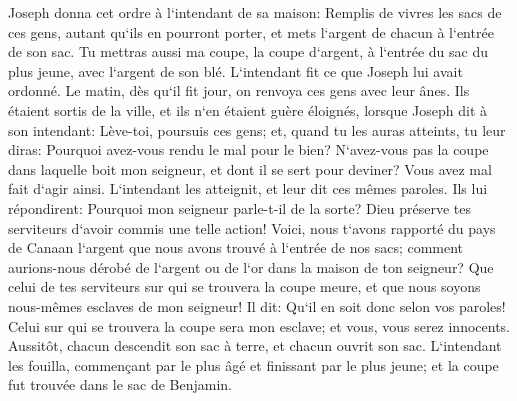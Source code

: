\verse Joseph donna cet ordre à l`intendant de sa maison: Remplis de vivres les sacs de ces gens, autant qu`ils en pourront porter, et mets l`argent de chacun à l`entrée de son sac. 
\verse Tu mettras aussi ma coupe, la coupe d`argent, à l`entrée du sac du plus jeune, avec l`argent de son blé. L`intendant fit ce que Joseph lui avait ordonné. 
\verse Le matin, dès qu`il fit jour, on renvoya ces gens avec leur ânes. 
\verse Ils étaient sortis de la ville, et ils n`en étaient guère éloignés, lorsque Joseph dit à son intendant: Lève-toi, poursuis ces gens; et, quand tu les auras atteints, tu leur diras: Pourquoi avez-vous rendu le mal pour le bien? 
\verse N`avez-vous pas la coupe dans laquelle boit mon seigneur, et dont il se sert pour deviner? Vous avez mal fait d`agir ainsi. 
\verse L`intendant les atteignit, et leur dit ces mêmes paroles. 
\verse Ils lui répondirent: Pourquoi mon seigneur parle-t-il de la sorte? Dieu préserve tes serviteurs d`avoir commis une telle action! 
\verse Voici, nous t`avons rapporté du pays de Canaan l`argent que nous avons trouvé à l`entrée de nos sacs; comment aurions-nous dérobé de l`argent ou de l`or dans la maison de ton seigneur? 
\verse Que celui de tes serviteurs sur qui se trouvera la coupe meure, et que nous soyons nous-mêmes esclaves de mon seigneur! 
\verse Il dit: Qu`il en soit donc selon vos paroles! Celui sur qui se trouvera la coupe sera mon esclave; et vous, vous serez innocents. 
\verse Aussitôt, chacun descendit son sac à terre, et chacun ouvrit son sac. 
\verse L`intendant les fouilla, commençant par le plus âgé et finissant par le plus jeune; et la coupe fut trouvée dans le sac de Benjamin. 
